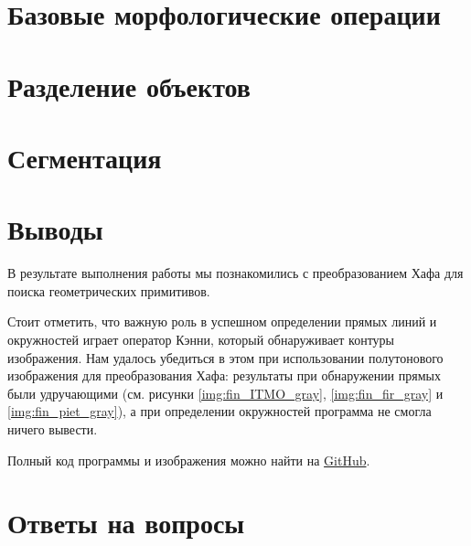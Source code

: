 \section{Базовые морфологические операции}


\newpage
\section{Разделение объектов}


\newpage
\section{Сегментация}

\newpage
\section{Выводы}

В результате выполнения работы мы познакомились с преобразованием Хафа для поиска геометрических примитивов.

Стоит отметить, что важную роль в успешном определении прямых линий и окружностей играет оператор Кэнни, который обнаруживает контуры изображения. Нам удалось убедиться в этом при использовании полутонового изображения для преобразования Хафа: результаты при обнаружении прямых были удручающими (см. рисунки \ref*{img:fin_ITMO_gray}, \ref*{img:fin_fir_gray} и \ref*{img:fin_piet_gray}), а при определении окружностей программа не смогла ничего вывести.

Полный код программы и изображения можно найти на \href{https://github.com/NikBrat/ComputerVision_Lab5}{GitHub}.

\section{Ответы на вопросы}

\setcounter{question}{0}

\newcommand{\question}[1]{\item[Q\refstepcounter{question}\thequestion.] #1}
\newcommand{\answer}[1]{\item[A\thequestion.] #1}


